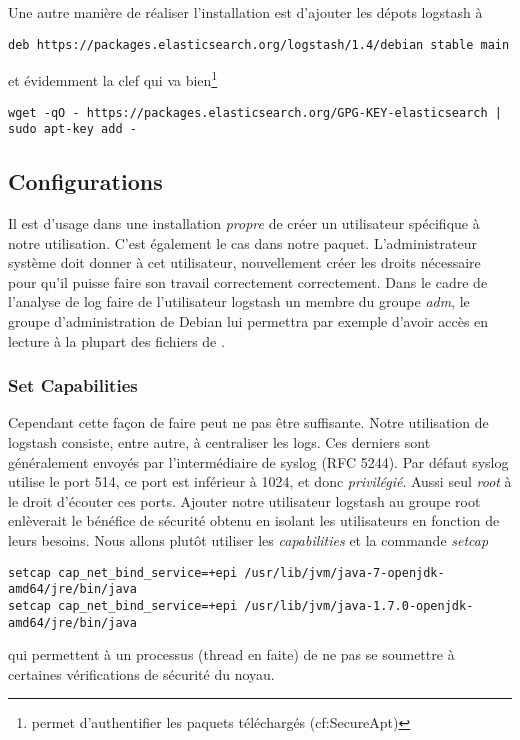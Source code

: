 Une autre manière de réaliser l'installation est d'ajouter les dépots logstash à 

\begin{lstlisting}[style=code,label={lst:ajoutdepotlogstash}]
deb https://packages.elasticsearch.org/logstash/1.4/debian stable main
\end{lstlisting}

et évidemment la clef qui va bien\footnote{permet d'authentifier les paquets téléchargés
(cf:SecureApt)}

\begin{lstlisting}[style=code,label={lst:ajoutclefdepotlogstash}]
wget -qO - https://packages.elasticsearch.org/GPG-KEY-elasticsearch | sudo apt-key add -
\end{lstlisting}

\subsection{Configurations}
Il est d'usage dans une installation \textit{propre} de créer un utilisateur spécifique
à notre utilisation. C'est également le cas dans notre paquet. L'administrateur 
système doit donner à cet utilisateur, nouvellement créer les droits nécessaire 
pour qu'il puisse faire son travail correctement correctement. Dans le cadre de 
l'analyse de log faire de l'utilisateur logstash un membre du groupe \emph{adm}, 
le groupe d'administration de Debian lui permettra par exemple d'avoir accès en 
lecture à la plupart des fichiers de .

\subsubsection{Set Capabilities}
Cependant cette façon de faire peut ne pas être suffisante.
Notre utilisation de logstash consiste, entre autre, à centraliser les \gls{logs}. 
Ces derniers sont généralement envoyés par l'intermédiaire de syslog (RFC 5244).
Par défaut syslog utilise le port 514, ce port est inférieur à 1024, et donc \textit{privilégié}.
Aussi seul \emph{root} à le droit d'écouter ces ports. Ajouter notre utilisateur 
logstash au groupe root enlèverait le bénéfice de sécurité obtenu en isolant les 
utilisateurs en fonction de leurs besoins. Nous allons plutôt utiliser les 
\emph{capabilities} 
et la commande \emph{setcap}
\begin{lstlisting}[style=code,label={lst:setcapabilities}]
setcap cap_net_bind_service=+epi /usr/lib/jvm/java-7-openjdk-amd64/jre/bin/java
setcap cap_net_bind_service=+epi /usr/lib/jvm/java-1.7.0-openjdk-amd64/jre/bin/java
\end{lstlisting}
qui permettent à un processus (thread en faite) de ne pas se soumettre à certaines 
vérifications de sécurité du noyau.

